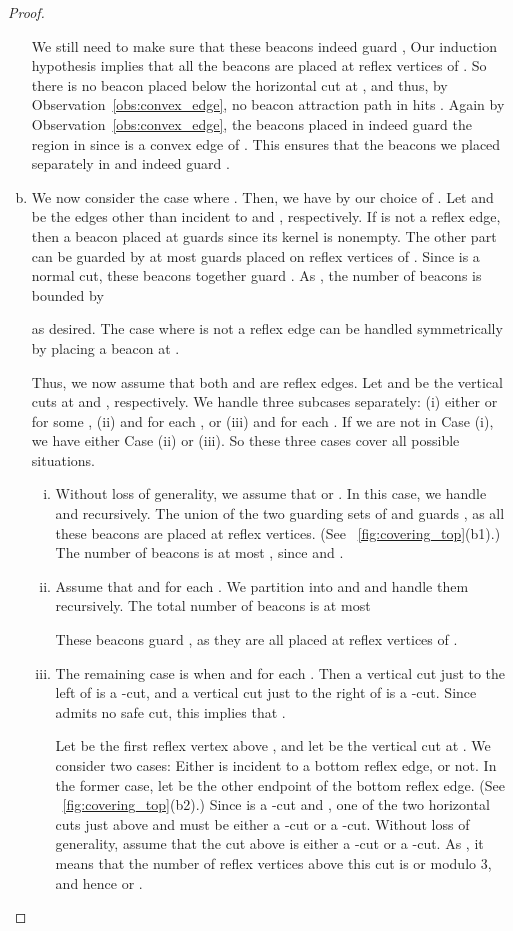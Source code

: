 \documentclass[11pt]{article}
\theoremstyle{definition}
\begin{document}
\begin{proof}
\begin{enumerate}[(a)]
 We still need to make sure that these beacons indeed guard ,
 Our induction hypothesis implies that all the beacons are placed at reflex vertices of .
 So there is no beacon placed below the horizontal cut at ,
 and thus, by Observation~\ref{obs:convex_edge}, no beacon attraction path in  hits .
 Again by Observation~\ref{obs:convex_edge}, the beacons placed in  indeed guard
 the region  in  since  is a convex edge of .
 This ensures that the beacons we placed separately in  and 
 indeed guard .

\item We now consider the case where .
 Then, we have  by our choice of .
 Let  and  be the edges other than   incident to  and , respectively.
 If  is not a reflex edge, then a beacon placed at  guards 
 since its kernel  is nonempty.
 The other part  can be guarded by at most 
 guards placed on reflex vertices of .
 Since  is a normal cut, these  beacons
 together guard .
 As , the number of beacons is bounded by
 
 as desired.
 The case where  is not a reflex edge   can be handled symmetrically
 by placing a beacon at .

 Thus, we now assume that both  and  are reflex edges.
 Let  and  be the vertical cuts at  and , respectively.
We handle three subcases separately:
 (i) either  or  for some ,
 (ii)  and  for each ,
 or (iii)  and  for each .
 If we are not in Case (i), we have either Case (ii) or (iii).
 So these three cases cover all possible situations.
 \begin{enumerate}[(i)]
 \item Without loss of generality, we assume that  or .
 In this case,  we handle  and  recursively.
 The union of the two guarding sets of  and  guards ,
 as all these beacons are placed at reflex vertices.
 (See \figurename~\ref{fig:covering_top}(b1).)
 The number of  beacons is at most  ,
 since  and .


 \item Assume that  and  for each .
 We partition  into  and  and handle them recursively.
 The total number of beacons is at most
 
 These beacons guard , as they are all placed at reflex vertices of .
 \item
 The remaining case is when  and 
 for each .
 Then a vertical cut just to the left of  is a -cut,
 and a vertical cut just to the right of  is a -cut.
 Since  admits no safe cut, this implies that .

 Let  be the first reflex vertex above , and let  be the vertical cut at .
 We consider two cases: Either  is incident to a bottom reflex edge, or not.
 In the former case, let  be the other endpoint of the bottom reflex edge.
 (See \figurename~\ref{fig:covering_top}(b2).)
 Since  is a -cut and , one of the two horizontal cuts just above  and 
 must be either a -cut or a -cut.
 Without loss of generality, assume that the cut above  is  either a -cut or a -cut.
 As , it means that the number of reflex vertices above this cut is  or 
 modulo 3, and hence  or .
 


\end{enumerate}
\end{enumerate}
\end{proof}
\end{document}
